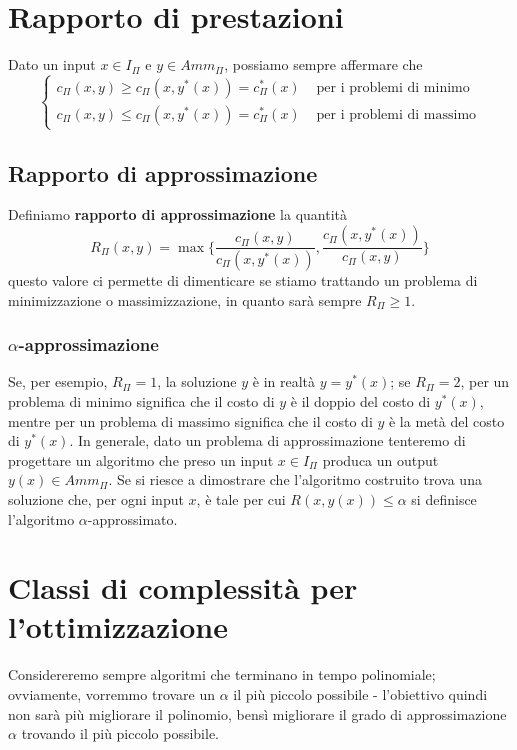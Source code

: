 \section{Rapporto di prestazioni}
Dato un input $x \in I_{\Pi}$ e $y \in Amm_{\Pi}$, possiamo sempre affermare che 
$$
\begin{cases}
  c_{\Pi}(x,y) \geq c_{\Pi}(x,y^*(x)) = c_{\Pi}^*(x) & \text{ per i problemi di minimo} \\
  c_{\Pi}(x,y) \leq c_{\Pi}(x,y^*(x)) = c_{\Pi}^*(x) & \text{ per i problemi di massimo}
\end{cases}
$$
\subsection{Rapporto di approssimazione}
Definiamo \textbf{rapporto di approssimazione} la quantità
$$
R_{\Pi}(x,y) = \max\{\frac{c_{\Pi}(x,y)}{c_{\Pi}(x, y^*(x))}, \frac{c_{\Pi}(x,y^*(x))}{c_{\Pi}(x, y)}\}
$$
questo valore ci permette di dimenticare se stiamo trattando un problema di 
minimizzazione o massimizzazione, in quanto sarà sempre $R_{\Pi} \geq 1$.

\subsubsection{$\alpha$-approssimazione}
Se, per esempio, $R_{\Pi} = 1$, la soluzione $y$ è in realtà $y = y^*(x)$; 
se $R_{\Pi} = 2$, per un problema di minimo significa che il costo di $y$ è 
il doppio del costo di $y^*(x)$, mentre per un problema di massimo significa che 
il costo di $y$ è la metà del costo di $y^*(x)$. 
In generale, dato un problema di approssimazione tenteremo di progettare
un algoritmo che preso un input $x \in I_{\Pi}$ produca un output $y(x) \in Amm_{\Pi}$. 
Se si riesce a dimostrare che l'algoritmo costruito trova una soluzione che, 
per ogni input $x$, è tale per cui $R(x,y(x)) \leq \alpha$ si definisce l'algoritmo 
$\alpha$-approssimato.

\section{Classi di complessità per l'ottimizzazione}
Considereremo sempre algoritmi che terminano in tempo polinomiale; ovviamente, 
vorremmo trovare un $\alpha$ il più piccolo possibile - l'obiettivo quindi non sarà
più migliorare il polinomio, bensì migliorare il grado di approssimazione $\alpha$
trovando il più piccolo possibile. 

